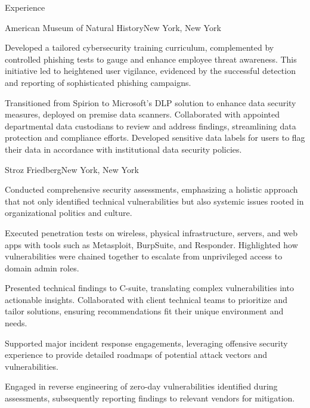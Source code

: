 \documentclass[]{mcdowellcv}
\begin{document}
\begin{cvsection}{Experience}
\begin{jobentry}{American Museum of Natural History}{New York, New York}
\begin{jobprojects}
            \item Developed a tailored cybersecurity training curriculum, complemented by controlled phishing tests to gauge and enhance employee threat awareness. This initiative led to heightened user vigilance, evidenced by the successful detection and reporting of sophisticated phishing campaigns.
            \item Transitioned from Spirion to Microsoft's DLP solution to enhance data security measures, deployed on premise data scanners. Collaborated with appointed departmental data custodians to review and address findings, streamlining data protection and compliance efforts. Developed sensitive data labels for users to flag their data in accordance with institutional data security policies. 
        \end{jobprojects}
    \end{jobentry}

    \begin{jobentry}{Stroz Friedberg}{New York, New York}
        \begin{jobpositions}
        \end{jobpositions}
        
        \begin{jobresponsibilities}
            \item Conducted comprehensive security assessments, emphasizing a holistic approach that not only identified technical vulnerabilities but also systemic issues rooted in organizational politics and culture.
            \item Executed penetration tests on wireless, physical infrastructure, servers, and web apps with tools such as Metasploit, BurpSuite, and Responder. Highlighted how vulnerabilities were chained together to escalate from unprivileged access to domain admin roles.
            \item Presented technical findings to C-suite, translating complex vulnerabilities into actionable insights. Collaborated with client technical teams to prioritize and tailor solutions, ensuring recommendations fit their unique environment and needs.
            \item Supported major incident response engagements, leveraging offensive security experience to provide detailed roadmaps of potential attack vectors and vulnerabilities.
            \item Engaged in reverse engineering of zero-day vulnerabilities identified during assessments, subsequently reporting findings to relevant vendors for mitigation.
        \end{jobresponsibilities}
        

\end{jobentry}
\end{cvsection}
\end{document}
